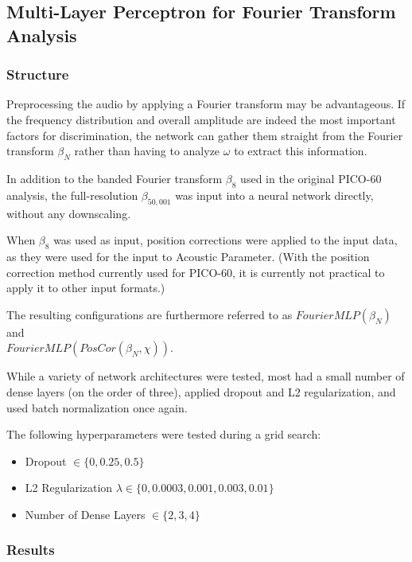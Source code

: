 \documentclass[10pt]{article}
\begin{document}
\subsection{Multi-Layer Perceptron for Fourier Transform Analysis} \label{mlp}

\subsubsection{Structure}

Preprocessing the audio by applying a Fourier transform may be advantageous. If the frequency distribution and overall amplitude are indeed the most important factors for discrimination, the network can gather them straight from the Fourier transform $\beta_{N}$ rather than having to analyze $\omega$ to extract this information.

In addition to the banded Fourier transform $\beta_{8}$ used in the original PICO-60 analysis, the full-resolution $\beta_{50,001}$ was input into a neural network directly, without any downscaling.

When $\beta_{8}$ was used as input, position corrections were applied to the input data, as they were used for the input to Acoustic Parameter. (With the position correction method currently used for PICO-60, it is currently not practical to apply it to other input formats.)

The resulting configurations are furthermore referred to as $FourierMLP(\beta_{N})$ and \\ $FourierMLP(PosCor(\beta_{N}, \chi))$.

While a variety of network architectures were tested, most had a small number of dense layers (on the order of three), applied dropout and L2 regularization, and used batch normalization once again.

The following hyperparameters were tested during a grid search:
\begin{itemize}
    \item Dropout $\in \{0, 0.25, 0.5\}$
    \item L2 Regularization $\lambda \in \{0, 0.0003, 0.001, 0.003, 0.01\}$
    \item Number of Dense Layers $\in \{2, 3, 4\}$
\end{itemize}

\subsubsection{Results}
\end{document}
